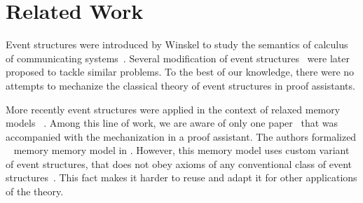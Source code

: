 \section{Related Work}

Event structures were introduced by Winskel to study the semantics of 
calculus of communicating systems~\cite{Winskel:82}. 
Several modification of event structures~\cite{Langerak:91, Boudol-Castellani:1991}
were later proposed to tackle similar problems.  
To the best of our knowledge, there were no attempts 
to mechanize the classical theory of event structures 
in proof assistants. 
 
More recently event structures were applied 
in the context of relaxed memory models~%
\cite{Jeffrey-Riely:LICS16, PichonPharabod-Sewell:POPL16, Chakraborty-Vafeiadis:POPL19, Moiseenko-al:ECOOP20}.
Among this line of work, we are aware of only one paper~\cite{Moiseenko-al:ECOOP20}
that was accompanied with the mechanization in a proof assistant. 
The authors formalized \weakestmo~\cite{Chakraborty-Vafeiadis:POPL19} 
memory memory model in \coq. However, this memory model uses 
custom variant of event structures, that does not 
obey axioms of any conventional class of 
event structures~\cite{Winskel:82, Langerak:91, Boudol-Castellani:1991}. 
This fact makes it harder to reuse and adapt it 
for other applications of the theory. 


